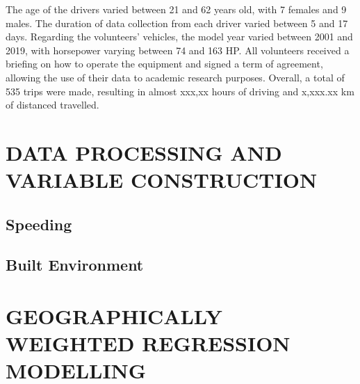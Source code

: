 The age of the drivers varied between 21 and 62 years old, with 7 females and 9 males. The duration of data collection from each driver varied between 5 and 17 days. Regarding the volunteers' vehicles, the model year varied between 2001 and 2019, with horsepower varying between 74 and 163 HP. All volunteers received a briefing on how to operate the equipment and signed a term of agreement, allowing the use of their data to academic research purposes. Overall, a total of 535 trips were made, resulting in almost xxx,xx hours of driving and x,xxx.xx km of distanced travelled.  


\section{DATA PROCESSING AND VARIABLE CONSTRUCTION} \label{data}


\subsection{Speeding}







\subsection{Built Environment}






\section{GEOGRAPHICALLY WEIGHTED REGRESSION MODELLING} \label{gwm}

